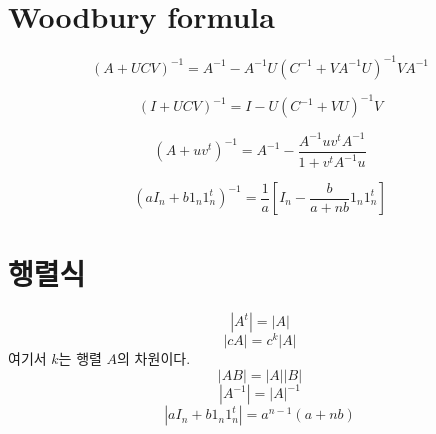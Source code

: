 \documentclass[
]{book}
\theoremstyle{definition}
\theoremstyle{definition}
\theoremstyle{definition}
\theoremstyle{definition}
\theoremstyle{remark}
\begin{document}
\hypertarget{woodbury-formula}{%
\section{Woodbury formula}\label{woodbury-formula}}

\[ (  A+  U  C  V)^{-1} =   A^{-1}-  A^{-1}   U (  C^{-1} +   V   A^{-1}  U)^{-1}   V   A^{-1} \]

\[ (  I+  U  C  V)^{-1} =   I -   U (  C^{-1} +   V   U)^{-1}   V \]

\[ (  A+  u  v^t)^{-1} =   A^{-1} - \frac{   A^{-1}   u  v^t   A^{-1}}{1+  v^t   A^{-1}  u} \]

\[ (a   I_n + b   1_n   1_n^t)^{-1} = \frac{1}{a} \left [   I_n - \frac{b}{a+nb}   1_n   1_n^t \right ] \]

\hypertarget{uxd589uxb82cuxc2dd}{%
\section{행렬식}\label{uxd589uxb82cuxc2dd}}

\[ |  A^t| =|  A| \]
\[ |c  A| =c^k |  A|\]
여기서 \(k\)는 행렬 \(A\)의 차원이다.
\[ |  A  B| =|  A| |  B| \]
\[ |  A^{-1}| =|  A|^{-1} \]
\[| a   I_n + b   1_n   1_n^t | = a^{n-1}(a+nb) \]

\backmatter

  
\end{document}
